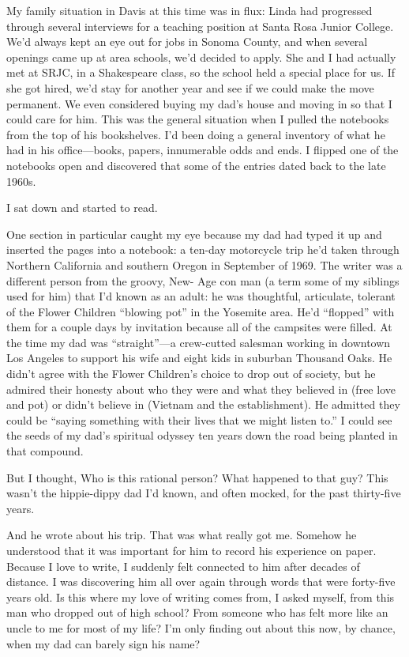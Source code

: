 \documentclass[12pt]{book}
\begin{document}
My family situation in Davis at this time was in flux: Linda had progressed through several interviews for a teaching position at Santa Rosa Junior College. We'd always kept an eye out for jobs in Sonoma County, and when several openings came up at area schools, we'd decided to apply. She and I had actually met at SRJC, in a Shakespeare class, so the school held a special place for us. If she got hired, we'd stay for another year and see if we could make the move permanent. We even considered buying my dad's house and moving in so that I could care for him. This was the general situation when I pulled the notebooks from the top of his bookshelves. I'd been doing a general inventory of what he had in his office---books, papers, innumerable odds and ends. I flipped one of the notebooks open and discovered that some of the entries dated back to the late 1960s.

I sat down and started to read.

One section in particular caught my eye because my dad had typed it up and inserted the pages into a notebook: a ten-day motorcycle trip he'd taken through Northern California and southern Oregon in September of 1969. The writer was a different person from the groovy, New- Age con man (a term some of my siblings used for him) that I'd known as an adult: he was thoughtful, articulate, tolerant of the Flower Children ``blowing pot'' in the Yosemite area. He'd ``flopped'' with them for a couple days by invitation because all of the campsites were filled. At the time my dad was ``straight''---a crew-cutted salesman working in downtown Los Angeles to support his wife and eight kids in suburban Thousand Oaks. He didn't agree with the Flower Children's choice to drop out of society, but he admired their honesty about who they were and what they believed in (free love and pot) or didn't believe in (Vietnam and the establishment). He admitted they could be ``saying something with their lives that we might listen to.'' I could see the seeds of my dad's spiritual odyssey ten years down the road being planted in that compound.

But I thought, Who is this rational person? What happened to that guy? This wasn't the hippie-dippy dad I'd known, and often mocked, for the past thirty-five years.

And he wrote about his trip. That was what really got me. Somehow he understood that it was important for him to record his experience on paper. Because I love to write, I suddenly felt connected to him after decades of distance. I was discovering him all over again through words that were forty-five years old. Is this where my love of writing comes from, I asked myself, from this man who dropped out of high school? From someone who has felt more like an uncle to me for most of my life? I'm only finding out about this now, by chance, when my dad can barely sign his name?
\end{document}
